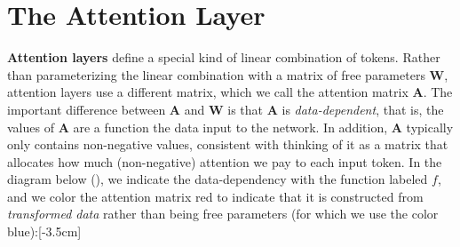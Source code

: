 
\section{The Attention Layer}
\textbf{Attention layers} define a special kind of linear combination of tokens. Rather than parameterizing the linear combination with a matrix of free parameters $\mathbf{W}$, attention layers use a different matrix, which we call the attention matrix $\mathbf{A}$. The important difference between $\mathbf{A}$ and $\mathbf{W}$ is that $\mathbf{A}$ is \textit{data-dependent}, that is, the values of $\mathbf{A}$ are a function the data input to the network. In addition, $\mathbf{A}$ typically only contains non-negative values, consistent with thinking of it as a matrix that allocates how much (non-negative) attention we pay to each input token. In the diagram below (\fig{\ref{fig:transformers:fc_vs_attn}}), we indicate the data-dependency with the function labeled $f$, and we color the attention matrix red to indicate that it is constructed from \textit{transformed data} rather than being free parameters (for which we use the color blue):[-3.5cm]
